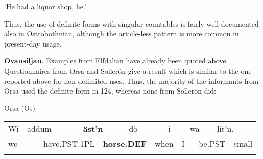 \begin{styleTranslation}
‘He had a liquor shop, he.’ 

\end{styleTranslation}

\begin{styleBodyTextFirst}
Thus, the use of definite forms with singular countables is fairly well documented also in Ostrobothnian, although the article-less pattern is more common in present-day usage.

\end{styleBodyTextFirst}

\begin{styleBodytextC}
\textbf{Ovansiljan}. Examples from Elfdalian have already been quoted above. Questionnaires from Orsa and Sollerön give a result which is similar to the one reported above for non-delimited uses. Thus, the majority of the informants from Orsa used the definite form in 124, whereas none from Sollerön did:

\end{styleBodytextC}

\begin{listWWNumileveli}
\item {}

\begin{styleExample}
\label{bkm:Ref224103820}Orsa (Os)

\end{styleExample}

\end{listWWNumileveli}

\begin{tabular}{llllllllllllll}
\lsptoprule
Wi & \multicolumn{2}{l}{addum

} & \multicolumn{2}{l}{{\bfseries äst’n}

} & \multicolumn{2}{l}{dö

} & \multicolumn{2}{l}{i

} & \multicolumn{2}{l}{wa

} & \multicolumn{2}{l}{lit’n.

} & \\
\multicolumn{2}{l}{we

} & \multicolumn{2}{l}{have.PST.1PL

} & \multicolumn{2}{l}{{\bfseries horse.DEF}

} & \multicolumn{2}{l}{when

} & \multicolumn{2}{l}{I 

} & \multicolumn{2}{l}{be.PST

} & \multicolumn{2}{l}{small

}\\
\lspbottomrule
\end{tabular}

